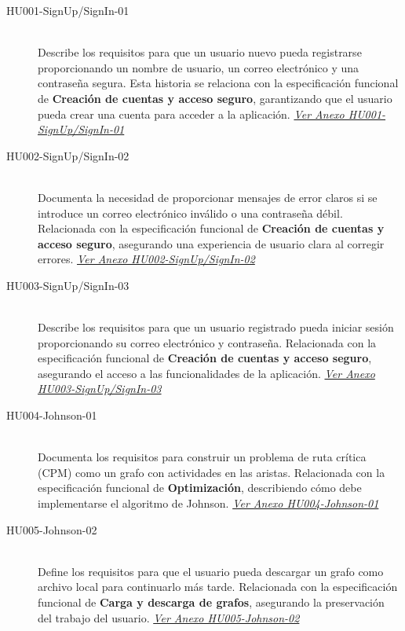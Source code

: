\documentclass[stu, 12pt, letterpaper, donotrepeattitle, floatsintext, natbib]{apa7}
\begin{document}
\begin{description}
    \item[HU001-SignUp/SignIn-01] \hfill \\
    Describe los requisitos para que un usuario nuevo pueda registrarse proporcionando un nombre de usuario, un correo electrónico y una contraseña segura. Esta historia se relaciona con la especificación funcional de \textbf{Creación de cuentas y acceso seguro}, garantizando que el usuario pueda crear una cuenta para acceder a la aplicación. \textit{\hyperref[tab:HU001-SignUp/SignIn-01]{Ver Anexo HU001-SignUp/SignIn-01}}

    \item[HU002-SignUp/SignIn-02] \hfill \\
    Documenta la necesidad de proporcionar mensajes de error claros si se introduce un correo electrónico inválido o una contraseña débil. Relacionada con la especificación funcional de \textbf{Creación de cuentas y acceso seguro}, asegurando una experiencia de usuario clara al corregir errores. \textit{\hyperref[tab:HU002-SignUp/SignIn-02]{Ver Anexo HU002-SignUp/SignIn-02}}

    \item[HU003-SignUp/SignIn-03] \hfill \\
    Describe los requisitos para que un usuario registrado pueda iniciar sesión proporcionando su correo electrónico y contraseña. Relacionada con la especificación funcional de \textbf{Creación de cuentas y acceso seguro}, asegurando el acceso a las funcionalidades de la aplicación. \textit{\hyperref[tab:HU003-SignUp/SignIn-03]{Ver Anexo HU003-SignUp/SignIn-03}}

    \item[HU004-Johnson-01] \hfill \\
    Documenta los requisitos para construir un problema de ruta crítica (CPM) como un grafo con actividades en las aristas. Relacionada con la especificación funcional de \textbf{Optimización}, describiendo cómo debe implementarse el algoritmo de Johnson. \textit{\hyperref[tab:HU004-Johnson-01]{Ver Anexo HU004-Johnson-01}}

    \item[HU005-Johnson-02] \hfill \\
    Define los requisitos para que el usuario pueda descargar un grafo como archivo local para continuarlo más tarde. Relacionada con la especificación funcional de \textbf{Carga y descarga de grafos}, asegurando la preservación del trabajo del usuario. \textit{\hyperref[tab:HU005-Johnson-02]{Ver Anexo HU005-Johnson-02}}


\end{description}
\end{document}
